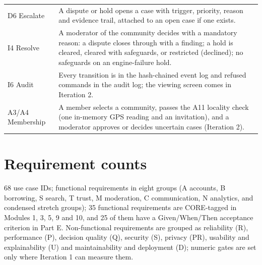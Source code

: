 \begin{longtable}{@{}L{68pt}L{315pt}@{}}
D6 Escalate & A dispute or hold opens a case with trigger, priority, reason and evidence trail, attached to an open case if one exists. \\
I4 Resolve & A moderator of the community decides with a mandatory reason: a dispute closes through  with a finding; a hold is cleared, cleared with safeguards, or restricted (declined); no safeguards on an engine-failure hold. \\
I6 Audit & Every transition is in the hash-chained event log and refused commands in the audit log; the viewing screen comes in Iteration 2. \\
A3/A4 Membership & A member selects a community, passes the A11 locality check (one in-memory GPS reading and an invitation), and a moderator approves or decides uncertain cases (Iteration 2). \\
\end{longtable}
\endgroup
\section{Requirement counts}\label{sec:requirement-counts}
68 use case IDs; functional requirements in eight groups (A accounts, B borrowing, S search, T trust, M moderation, C communication, N analytics, and condensed stretch groups); 35 functional requirements are CORE-tagged in Modules 1, 3, 5, 9 and 10, and 25 of them have a Given/When/Then acceptance criterion in Part E. Non-functional requirements are grouped as reliability (R), performance (P), decision quality (Q), security (S), privacy (PR), usability and explainability (U) and maintainability and deployment (D); numeric gates are set only where Iteration 1 can measure them.
